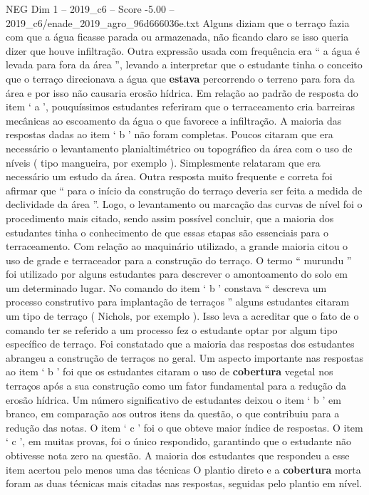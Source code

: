 \begin{textsample}{NEG Dim 1 – 2019\_c6 – Score -5.00 – 2019\_c6/enade\_2019\_agro\_96d666036e.txt}
Alguns diziam que o terraço fazia com que a água ficasse parada ou armazenada, não ficando claro se isso queria dizer que houve infiltração.
Outra expressão usada com frequência era “ a água é levada para fora da área ”, levando a interpretar que o estudante tinha o conceito que o terraço direcionava a água que \textbf{estava} percorrendo o terreno para fora da área e por isso não causaria erosão hídrica.
Em relação ao padrão de resposta do item ‘ a ’, pouquíssimos estudantes referiram que o terraceamento cria barreiras mecânicas ao escoamento da água o que favorece a infiltração.
A maioria das respostas dadas ao item ‘ b ’ não foram completas.
Poucos citaram que era necessário o levantamento planialtimétrico ou topográfico da área com o uso de níveis ( tipo mangueira, por exemplo ).
Simplesmente relataram que era necessário um estudo da área.
Outra resposta muito frequente e correta foi afirmar que “ para o início da construção do terraço deveria ser feita a medida de declividade da área ”.
Logo, o levantamento ou marcação das curvas de nível foi o procedimento mais citado, sendo assim possível concluir, que a maioria dos estudantes tinha o conhecimento de que essas etapas são essenciais para o terraceamento.
Com relação ao maquinário utilizado, a grande maioria citou o uso de grade e terraceador para a construção do terraço.
O termo “ murundu ” foi utilizado por alguns estudantes para descrever o amontoamento do solo em um determinado lugar.
No comando do item ‘ b ’ constava “ descreva um processo construtivo para implantação de terraços ” alguns estudantes citaram um tipo de terraço ( Nichols, por exemplo ).
Isso leva a acreditar que o fato de o comando ter se referido a um processo fez o estudante optar por algum tipo específico de terraço.
Foi constatado que a maioria das respostas dos estudantes abrangeu a construção de terraços no geral.
Um aspecto importante nas respostas ao item ‘ b ’ foi que os estudantes citaram o uso de \textbf{cobertura} vegetal nos terraços após a sua construção como um fator fundamental para a redução da erosão hídrica.
Um número significativo de estudantes deixou o item ‘ b ’ em branco, em comparação aos outros itens da questão, o que contribuiu para a redução das notas.
O item ‘ c ’ foi o que obteve maior índice de respostas.
O item ‘ c ’, em muitas provas, foi o único respondido, garantindo que o estudante não obtivesse nota zero na questão.
A maioria dos estudantes que respondeu a esse item acertou pelo menos uma das técnicas O plantio direto e a \textbf{cobertura} morta foram as duas técnicas mais citadas nas respostas, seguidas pelo plantio em nível.

\end{textsample}
